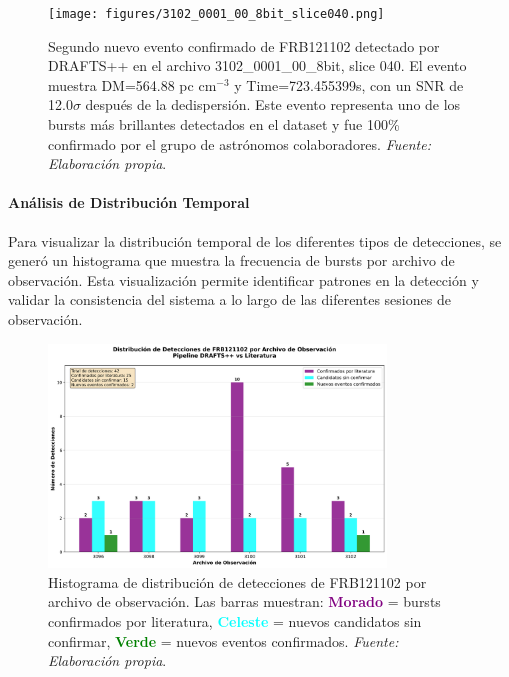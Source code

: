 \begin{figure}[H]
    \centering
    \texttt{[image: figures/3102\_0001\_00\_8bit\_slice040.png]}
    \caption[FRB121102: nuevo evento confirmado (3102\_...\_slice040)]{Segundo nuevo evento confirmado de FRB121102 detectado por DRAFTS++ en el archivo 3102\_0001\_00\_8bit, slice 040. El evento muestra DM=564.88 pc cm$^{-3}$ y Time=723.455399s, con un SNR de 12.0$\sigma$ después de la dedispersión. Este evento representa uno de los bursts más brillantes detectados en el dataset y fue 100\% confirmado por el grupo de astrónomos colaboradores. \textit{Fuente: Elaboración propia}.}
    \label{fig:new_event_3102}
\end{figure}

\paragraph{Análisis de Distribución Temporal}

Para visualizar la distribución temporal de los diferentes tipos de detecciones, se generó un histograma que muestra la frecuencia de bursts por archivo de observación. Esta visualización permite identificar patrones en la detección y validar la consistencia del sistema a lo largo de las diferentes sesiones de observación.

\begin{figure}[H]
    \centering
    \includegraphics[width=0.8\textwidth]{figures/frb121102_detection_histogram.png}
    \caption[Histograma de detecciones FRB121102]{Histograma de distribución de detecciones de FRB121102 por archivo de observación. Las barras muestran: \textcolor{purple}{\textbf{Morado}} = bursts confirmados por literatura, \textcolor{cyan}{\textbf{Celeste}} = nuevos candidatos sin confirmar, \textcolor{green}{\textbf{Verde}} = nuevos eventos confirmados. \textit{Fuente: Elaboración propia}.}
    \label{fig:frb121102_histogram}
\end{figure}

